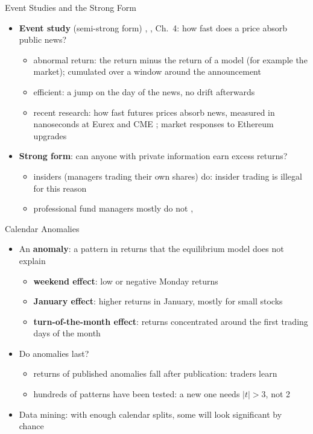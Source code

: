 \begin{frame}{Event Studies and the Strong Form}
\itemsize{\small}
\begin{itemize}
    \item \textbf{Event study} (semi-strong form) , , Ch.~4: how fast does a price absorb public news?
    \begin{itemize}
        \item abnormal return: the return minus the return of a model (for example the market); cumulated over a window around the announcement
        \item efficient: a jump on the day of the news, no drift afterwards
        \item recent research: how fast futures prices absorb news, measured in nanoseconds at Eurex and CME ; market responses to Ethereum upgrades 
    \end{itemize}
    \item \textbf{Strong form}: can anyone with private information earn excess returns?
    \begin{itemize}
        \item insiders (managers trading their own shares) do: insider trading is illegal for this reason
        \item professional fund managers mostly do not , 
    \end{itemize}
\end{itemize}
\end{frame}

\begin{frame}{Calendar Anomalies}
\itemsize{\small}
\begin{itemize}
    \item An \textbf{anomaly}: a pattern in returns that the equilibrium model does not explain
    \begin{itemize}
        \item \textbf{weekend effect}: low or negative Monday returns 
        \item \textbf{January effect}: higher returns in January, mostly for small stocks 
        \item \textbf{turn-of-the-month effect}: returns concentrated around the first trading days of the month 
    \end{itemize}
    \item Do anomalies last?
    \begin{itemize}
        \item returns of published anomalies fall after publication: traders learn 
        \item hundreds of patterns have been tested: a new one needs $|t| > 3$, not 2 
    \end{itemize}
    \item Data mining: with enough calendar splits, some will look significant by chance
\end{itemize}
\end{frame}

